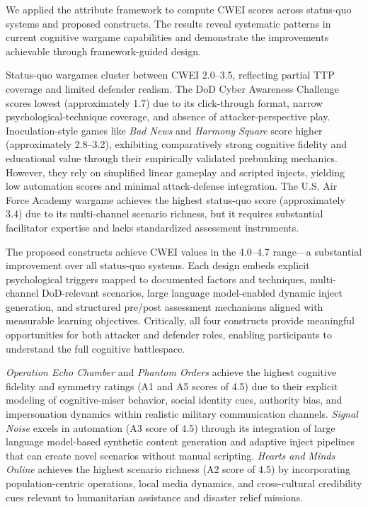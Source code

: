\documentclass[12pt]{article}
\begin{document}
We applied the attribute framework to compute CWEI scores across status-quo systems and proposed constructs. The results reveal systematic patterns in current cognitive wargame capabilities and demonstrate the improvements achievable through framework-guided design.

Status-quo wargames cluster between CWEI 2.0--3.5, reflecting partial TTP coverage and limited defender realism. The DoD Cyber Awareness Challenge scores lowest (approximately 1.7) due to its click-through format, narrow psychological-technique coverage, and absence of attacker-perspective play. Inoculation-style games like \textit{Bad News} and \textit{Harmony Square} score higher (approximately 2.8--3.2), exhibiting comparatively strong cognitive fidelity and educational value through their empirically validated prebunking mechanics. However, they rely on simplified linear gameplay and scripted injects, yielding low automation scores and minimal attack-defense integration. The U.S. Air Force Academy wargame achieves the highest status-quo score (approximately 3.4) due to its multi-channel scenario richness, but it requires substantial facilitator expertise and lacks standardized assessment instruments.

The proposed constructs achieve CWEI values in the 4.0--4.7 range---a substantial improvement over all status-quo systems. Each design embeds explicit psychological triggers mapped to documented factors and techniques, multi-channel DoD-relevant scenarios, large language model-enabled dynamic inject generation, and structured pre/post assessment mechanisms aligned with measurable learning objectives. Critically, all four constructs provide meaningful opportunities for both attacker and defender roles, enabling participants to understand the full cognitive battlespace.

\textit{Operation Echo Chamber} and \textit{Phantom Orders} achieve the highest cognitive fidelity and symmetry ratings (A1 and A5 scores of 4.5) due to their explicit modeling of cognitive-miser behavior, social identity cues, authority bias, and impersonation dynamics within realistic military communication channels. \textit{Signal Noise} excels in automation (A3 score of 4.5) through its integration of large language model-based synthetic content generation and adaptive inject pipelines that can create novel scenarios without manual scripting. \textit{Hearts and Minds Online} achieves the highest scenario richness (A2 score of 4.5) by incorporating population-centric operations, local media dynamics, and cross-cultural credibility cues relevant to humanitarian assistance and disaster relief missions.
\end{document}
